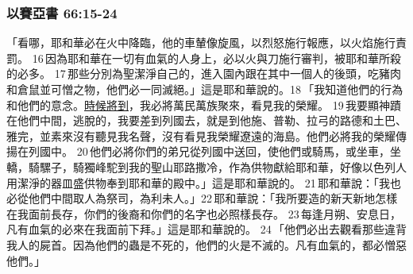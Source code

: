 \subsubsection{以賽亞書 66:15-24}
「看哪，耶和華必在火中降臨，他的車輦像旋風，以烈怒施行報應，以火焰施行責罰。 16 因為耶和華在一切有血氣的人身上，必以火與刀施行審判，被耶和華所殺的必多。 17 那些分別為聖潔淨自己的，進入園內跟在其中一個人的後頭，吃豬肉和倉鼠並可憎之物，他們必一同滅絕。」這是耶和華說的。18 「我知道他們的行為和他們的意念。\underline{時候將到}，我必將萬民萬族聚來，看見我的榮耀。 19 我要顯神蹟在他們中間，逃脫的，我要差到列國去，就是到他施、普勒、拉弓的路德和土巴、雅完，並素來沒有聽見我名聲，沒有看見我榮耀遼遠的海島。他們必將我的榮耀傳揚在列國中。 20 他們必將你們的弟兄從列國中送回，使他們或騎馬，或坐車，坐轎，騎騾子，騎獨峰駝到我的聖山耶路撒冷，作為供物獻給耶和華，好像以色列人用潔淨的器皿盛供物奉到耶和華的殿中。」這是耶和華說的。 21 耶和華說：「我也必從他們中間取人為祭司，為利未人。」22 耶和華說：「我所要造的新天新地怎樣在我面前長存，你們的後裔和你們的名字也必照樣長存。 23 每逢月朔、安息日，凡有血氣的必來在我面前下拜。」這是耶和華說的。 24 「他們必出去觀看那些違背我人的屍首。因為他們的蟲是不死的，他們的火是不滅的。凡有血氣的，都必憎惡他們。」


